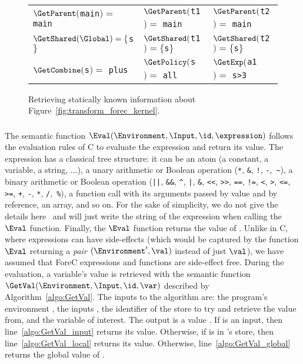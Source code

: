 \begin{figure}
	\centering
	\def\arraystretch{1.3}
	
	\begin{tabular}{|l l l|}
		\hline
		$\GetParent($\verb$main$$) =$ \verb$main$	& $\GetParent($\verb$t1$$) =$ \verb$main$		& $\GetParent($\verb$t2$$) =$ \verb$main$	\\
		$\GetShared(\Global) = \{$\verb$s$$\}$		& $\GetShared($\verb$t1$$) = \{$\verb$s$$\}$	& $\GetShared($\verb$t2$$) = \{$\verb$s$$\}$\\
		$\GetCombine($\verb$s$$) =$ \verb$plus$		& $\GetPolicy($\verb$s$$) =$ \verb$all$			& $\GetExp($\verb$a1$$) =$ \verb$s>3$		\\
		\hline
	\end{tabular}
	
	\caption{Retrieving statically known information about Figure~\ref{fig:transform_forec_kernel}.}
	\label{fig:forec_predicates}
\end{figure}

\subsubsection{}
\label{sec:forec_Eval}
The semantic function $\Eval(\Environment, \Input, \id, \expression)$ 
follows the evaluation rules of C to evaluate the expression
\expression{} and return its value. 
The expression \expression{} has a classical tree structure: it can
be an atom (a constant, a variable, a string, ...), a unary
arithmetic or Boolean operation (\texttt{*}, \texttt{\&}, \texttt{!}, 
\texttt{-},~\texttt{\~}), a binary arithmetic or Boolean 
operation (\texttt{||}, \texttt{\&\&}, \texttt{\^}, 
\texttt{|}, \texttt{\&}, \texttt{<}\texttt{<}, \texttt{>}\texttt{>}, \texttt{==}, 
\texttt{!=}, \texttt{<}, \texttt{>}, \texttt{<=}, \texttt{>=}, \texttt{+},
\texttt{-}, \texttt{*}, \texttt{/},~\texttt{\%}), a function call with its arguments
passed by value and by reference, an array, and so on. For
the sake of simplicity, we do not give the details 
here~\cite{programming_languages_clight,programming_languages_cholera} and
will just write the string of the expression when calling
the $\Eval$ function. Finally, the $\Eval$ function returns the
value of \expression{}. Unlike in C, where expressions can have 
side-effects (which would be captured by the function $\Eval$
returning a \emph{pair} $(\Environment', \val)$ instead of just $\val$),
we have assumed that ForeC expressions and functions are
side-effect free. During the evaluation, a
variable's value is retrieved with the semantic function
$\GetVal(\Environment, \Input, \id, \var)$ described by
Algorithm~\ref{algo:GetVal}. The inputs to the algorithm
are: the program's environment \Environment{}, the inputs
\Input{}, the identifier \id{} of the
store to try and retrieve the value from, and the variable
\var{} of interest. The output is a value \val{}. If \var{}
is an input, then line~\ref{algo:GetVal_input} returns its 
value. Otherwise, if \var{} is in
\id{}'s store, then line~\ref{algo:GetVal_local} returns its 
value. Otherwise, line~\ref{algo:GetVal_global} returns the 
global value of \var{}.

